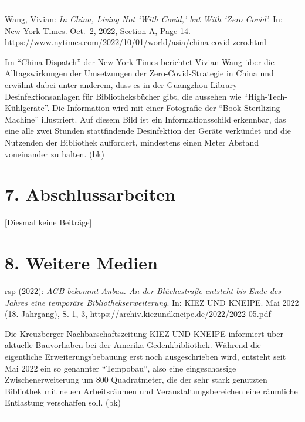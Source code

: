 \documentclass[a4paper,
fontsize=11pt,
oneside,
numbers=noperiodatend,
parskip=half-,
bibliography=totoc,
final
]{scrartcl}
\begin{document}
\begin{center}\rule{0.5\linewidth}{0.5pt}\end{center}

Wang, Vivian: \emph{In China, Living Not \enquote*{With Covid,} but With
\enquote*{Zero Covid}.} In: New York Times. Oct.~2, 2022, Section A,
Page 14.
\url{https://www.nytimes.com/2022/10/01/world/asia/china-covid-zero.html}

Im \enquote{China Dispatch} der New York Times berichtet Vivian Wang
über die Alltagswirkungen der Umsetzungen der Zero-Covid-Strategie in
China und erwähnt dabei unter anderem, dass es in der Guangzhou Library
Desinfektionsanlagen für Bibliotheksbücher gibt, die aussehen wie
\enquote{High-Tech-Kühlgeräte}. Die Information wird mit einer
Fotografie der \enquote{Book Sterilizing Machine} illustriert. Auf
diesem Bild ist ein Informationsschild erkennbar, das eine alle zwei
Stunden stattfindende Desinfektion der Geräte verkündet und die
Nutzenden der Bibliothek auffordert, mindestens einen Meter Abstand
voneinander zu halten. (bk)

\hypertarget{abschlussarbeiten}{%
\section{7. Abschlussarbeiten}\label{abschlussarbeiten}}

{[}Diesmal keine Beiträge{]}

\hypertarget{weitere-medien}{%
\section{8. Weitere Medien}\label{weitere-medien}}

rsp (2022): \emph{AGB bekommt Anbau. An der Blüchestraße entsteht bis
Ende des Jahres eine temporäre Bibliothekserweiterung}. In: KIEZ UND
KNEIPE. Mai 2022 (18. Jahrgang), S. 1, 3,
\url{https://archiv.kiezundkneipe.de/2022/2022-05.pdf}

Die Kreuzberger Nachbarschaftszeitung KIEZ UND KNEIPE informiert über
aktuelle Bauvorhaben bei der Amerika-Gedenkbibliothek. Während die
eigentliche Erweiterungsbebauung erst noch ausgeschrieben wird, entsteht
seit Mai 2022 ein so genannter \enquote{Tempobau}, also eine
eingeschossige Zwischenerweiterung um 800 Quadratmeter, die der sehr
stark genutzten Bibliothek mit neuen Arbeitsräumen und
Veranstaltungsbereichen eine räumliche Entlastung verschaffen soll. (bk)

\begin{center}\rule{0.5\linewidth}{0.5pt}\end{center}
\end{document}
